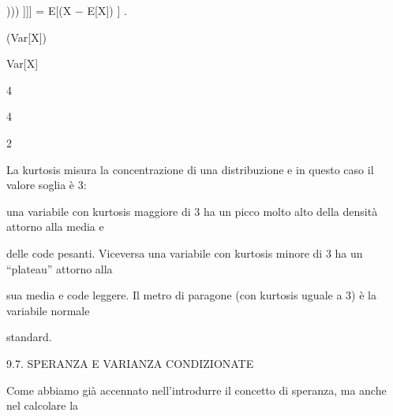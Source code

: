\documentclass[a4paper,portrait,12pt]{article}
\begin{document}
\begin{flushleft}
[[[((( X $-$ E[X] ))) ]]] = E[(X $-$ E[X]) ] .
\end{flushleft}


\begin{flushleft}
(Var[X])
\end{flushleft}


\begin{flushleft}
Var[X]
\end{flushleft}


4





4





2





\begin{flushleft}
La kurtosis misura la concentrazione di una distribuzione e in questo caso il valore soglia \`{e} 3:
\end{flushleft}


\begin{flushleft}
una variabile con kurtosis maggiore di 3 ha un picco molto alto della densit\`{a} attorno alla media e
\end{flushleft}


\begin{flushleft}
delle code pesanti. Viceversa una variabile con kurtosis minore di 3 ha un {``}plateau'' attorno alla
\end{flushleft}


\begin{flushleft}
sua media e code leggere. Il metro di paragone (con kurtosis uguale a 3) \`{e} la variabile normale
\end{flushleft}


\begin{flushleft}
standard.
\end{flushleft}





\begin{flushleft}
9.7. SPERANZA E VARIANZA CONDIZIONATE
\end{flushleft}


\begin{flushleft}
Come abbiamo gi\`{a} accennato nell'introdurre il concetto di speranza, ma anche nel calcolare la
\end{flushleft}
\end{document}
